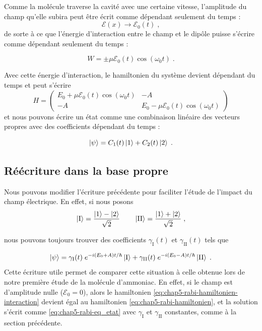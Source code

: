 \documentclass[../notesdecours.tex]{subfiles}
\begin{document}
\begin{center}
    {\color{red}{Ajouter dispositif}}
\end{center}
Comme la molécule traverse la cavité avec une certaine vitesse, l'amplitude du champ qu'elle subira peut être écrit comme dépendant seulement du temps :
$$\mathcal{E}(x) \rightarrow\mathcal{E}_0(t) \; ,$$ de sorte à ce que l'énergie d'interaction entre le champ et le dipôle puisse s'écrire comme dépendant seulement du temps :

$$W = \pm\mu\mathcal{E}_0(t)\cos(\omega_0 t) \; .$$

Avec cette énergie d'interaction, le hamiltonien du système devient dépendant du temps et peut s'écrire
\begin{equation}
    H = 
    \begin{pmatrix}
        E_0 + \mu\mathcal{E}_0(t)\cos(\omega_0 t)& -A\\
        -A & E_0 - \mu\mathcal{E}_0(t)\cos(\omega_0 t)
    \end{pmatrix}\label{eq:chap5-rabi-hamiltonien-interaction}
\end{equation}
et nous pouvons écrire un état comme une combinaison linéaire des vecteurs propres avec des coefficients dépendant du temps : 

$$\ket\psi = C_1(t) \ket 1 + C_2(t)\ket 2\; .$$

\subsection{Réécriture dans la base propre}
Nous pouvons modifier l'écriture précédente pour faciliter l'étude de l'impact du champ électrique. En effet, si nous posons 
$$\ket{\mathrm{I}} = \dfrac{\ket 1 - \ket 2}{\sqrt{2}} \qquad \ket{ \mathrm{II}} = \dfrac{\ket 1 + \ket 2}{\sqrt{2}} \; ,$$

nous pouvons toujours trouver des coefficients $\gamma_\mathrm{I}(t)$ et $\gamma_\mathrm{II}(t)$ tels que

\begin{equation}\label{eq:chap5-rabi-eq_etat}
    \ket \psi = \gamma_\mathrm{I}(t) \; e^{-i(E_0+A) t/\hbar} \ket{\mathrm{I}} +\gamma_\mathrm{II}(t) \; e^{-i(E_0-A) t/\hbar} \ket{\mathrm{II}} \; .
\end{equation}
Cette écriture utile permet de comparer cette situation à celle obtenue lors de notre première étude de la molécule d'ammoniac. En effet, si le champ est d'amplitude nulle ($\mathcal{E}_0 = 0$), alors le hamiltonien \eqref{eq:chap5-rabi-hamiltonien-interaction} devient égal au hamiltonien \eqref{eq:chap5-rabi-hamiltonien}, et la solution s'écrit comme \eqref{eq:chap5-rabi-eq_etat} avec $\gamma_\mathrm{I}$ et $\gamma_\mathrm{II}$ constantes, comme à la section précédente.
\end{document}
